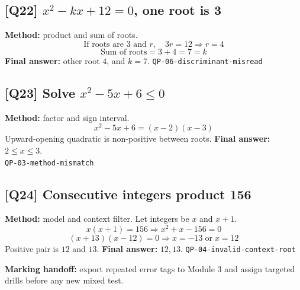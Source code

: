 \documentclass[11pt,a4paper]{article}
\newcommand{\QID}[1]{\textcolor{MPrimary}{\textbf{[#1]}}}
\newcommand{\Tag}[1]{\textcolor{MMuted}{\texttt{#1}}}
\begin{document}
\subsection*{\QID{Q22} \(x^2-kx+12=0\), one root is 3}
\textbf{Method:} product and sum of roots.
\[
\text{If roots are }3\text{ and }r,\quad 3r=12\Rightarrow r=4
\]
\[
\text{Sum of roots}=3+4=7=k
\]
\textbf{Final answer:} other root \(4\), and \(k=7\). \Tag{QP-06-discriminant-misread}

\subsection*{\QID{Q23} Solve \(x^2-5x+6\le0\)}
\textbf{Method:} factor and sign interval.
\[
x^2-5x+6=(x-2)(x-3)
\]
Upward-opening quadratic is non-positive between roots.
\textbf{Final answer:} \(2\le x\le3\).\\
\Tag{QP-03-method-mismatch}

\subsection*{\QID{Q24} Consecutive integers product 156}
\textbf{Method:} model and context filter.
Let integers be \(x\) and \(x+1\).
\[
x(x+1)=156 \Rightarrow x^2+x-156=0
\]
\[
(x+13)(x-12)=0 \Rightarrow x=-13\;\text{or}\;x=12
\]
Positive pair is \(12\) and \(13\).
\textbf{Final answer:} \(12,13\). \Tag{QP-04-invalid-context-root}

\begin{tcolorbox}[masterycard,colback=MSoft]
\textbf{Marking handoff:} export repeated error tags to Module 3 and assign targeted drills before any new mixed test.
\end{tcolorbox}
\end{document}
